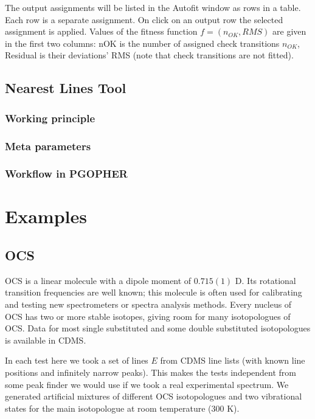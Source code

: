 \documentclass[11pt]{article}
\begin{document}
The output assignments will be listed in the Autofit window as rows in a table. Each row is a separate assignment. On click on an output row the selected assignment is applied. Values of the fitness function $f = (n_{OK}, {RMS})$ are given in the first two columns: nOK is the number of assigned check transitions $n_{OK}$, Residual is their deviations' RMS (note that check transitions are not fitted).


\subsection{Nearest Lines Tool}
\subsubsection{Working principle}
\subsubsection{Meta parameters}
\subsubsection{Workflow in PGOPHER}


\section{Examples}
\subsection{OCS}

OCS is a linear molecule with a dipole moment of $0.715(1)$ D. Its rotational transition frequencies are well known; this molecule is often used for calibrating and testing new spectrometers or spectra analysis methods. Every nucleus of OCS has two or more stable isotopes, giving room for many isotopologues of OCS. Data for most single substituted and some double substituted isotopologues is available in CDMS.

In each test here we took a set of lines $E$ from CDMS line lists (with known line positions and infinitely narrow peaks). This makes the tests independent from some peak finder we would use if we took a real experimental spectrum. We generated artificial mixtures of different OCS isotopologues and two vibrational states for the main isotopologue at room temperature (300 K).
\end{document}
